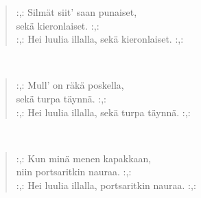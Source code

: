 \noindent\begin{minipage}{\linewidth}
\begin{verse}
	\hspace{0pt-\widthof{:,: }}:,: Silmät siit' saan punaiset,\\
	sekä kieronlaiset. :,:\\
	\hspace{0pt-\widthof{:,: }}:,: Hei luulia illalla, sekä kieronlaiset. :,:\\
\end{verse}
\end{minipage}\\[10pt]
\noindent\begin{minipage}{\linewidth}
\begin{verse}
	\hspace{0pt-\widthof{:,: }}:,: Mull' on räkä poskella,\\
	sekä turpa täynnä. :,:\\
	\hspace{0pt-\widthof{:,: }}:,: Hei luulia illalla, sekä turpa täynnä. :,:\\
\end{verse}
\end{minipage}\\[10pt]
\noindent\begin{minipage}{\linewidth}
\begin{verse}
	\hspace{0pt-\widthof{:,: }}:,: Kun minä menen kapakkaan,\\
	niin portsaritkin nauraa. :,:\\
	\hspace{0pt-\widthof{:,: }}:,: Hei luulia illalla, portsaritkin nauraa. :,:\\
\end{verse}
\end{minipage}\\[10pt]
%
%
